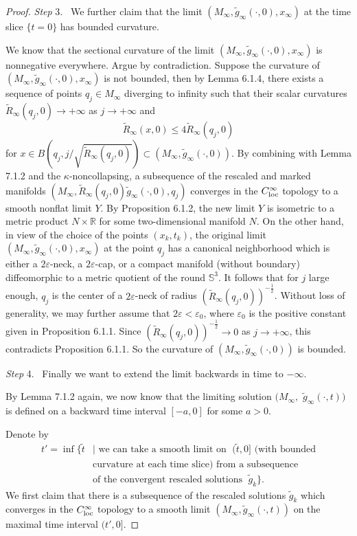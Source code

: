 \begin{proof}
\medskip
{\it Step} 3. \ We further claim that the limit $(M_{\infty},
\tilde{g}_{\infty}(\cdot,0),x_{\infty})$ at the time slice $\{ t=0
\}$ has bounded curvature.

We know that the sectional curvature of the limit $(M_{\infty},
\tilde{g}_{\infty}(\cdot,0),x_{\infty})$ is nonnegative
everywhere. Argue by contradiction. Suppose the curvature of
$(M_{\infty}, \tilde{g}_{\infty}(\cdot,0),x_{\infty})$ is not
bounded, then by Lemma 6.1.4, there exists a sequence of points
$q_j \in M_{\infty}$ diverging to infinity such that their scalar
curvatures $\tilde{R}_{\infty}(q_j,0) \rightarrow +\infty$ as $j
\rightarrow +\infty$ and
$$
\tilde{R}_{\infty}(x,0) \leq 4\tilde{R}_{\infty}(q_j,0)
$$
for $x \in B(q_j, j/\sqrt{\tilde{R}_{\infty}(q_j,0)})\subset
(M_{\infty},\tilde{g}_{\infty}(\cdot,0))$. By combining with Lemma
7.1.2 and the $\kappa$-noncollapsing, a subsequence of the
rescaled and marked manifolds
$(M_{\infty},\tilde{R}_{\infty}(q_j,0)\tilde{g}_{\infty}(\cdot,0),q_j)$
converges in the $C^{\infty}_{\rm loc}$ topology to a smooth
nonflat limit $Y$. By Proposition 6.1.2, the new limit $Y$ is
isometric to a metric product $N \times \mathbb{R}$ for some
two-dimensional manifold $N$. On the other hand, in view of the
choice of the points $(x_k,t_k)$, the original limit $(M_{\infty},
\tilde{g}_{\infty}(\cdot,0),x_{\infty})$ at the point $q_j$ has a
canonical neighborhood which is either a $2\varepsilon$-neck, a
$2\varepsilon$-cap, or a compact manifold (without boundary)
diffeomorphic to a metric quotient of the round $\mathbb{S}^3$. It
follows that for $j$ large enough, $q_j$ is the center of a
$2\varepsilon$-neck of radius
$(\tilde{R}_{\infty}(q_j,0))^{-\frac{1}{2}}$. Without loss of
generality, we may further assume that $2\varepsilon <
\varepsilon_0$, where $\varepsilon_0$ is the positive constant
given in Proposition 6.1.1. Since
$(\tilde{R}_{\infty}(q_j,0))^{-\frac{1}{2}}\rightarrow 0$ as
$j\rightarrow +\infty$, this contradicts Proposition 6.1.1. So the
curvature of $(M_{\infty}, \tilde{g}_{\infty}(\cdot,0))$ is
bounded.

\medskip
{\it Step} 4. \  Finally we want to extend the limit backwards in
time to $-\infty$.

By Lemma 7.1.2 again, we now know that the limiting solution
$(M_{\infty},$ $\tilde{g}_{\infty}(\cdot,t))$ is defined on a
backward time interval $[-a,0]$ for some $a>0$.

Denote by
\begin{align*}
t' = \inf \{ \tilde{t}&  | \mbox{ we can take a
smooth limit on }\; (\tilde{t},0]  \mbox { (with bounded} \\
& \mbox {curvature at each time slice) from a subsequence}\\
&  \mbox {of the convergent rescaled solutions }\; \tilde{g}_k\}.
\end{align*}
We first claim that there is a subsequence of the rescaled
solutions $\tilde{g}_k$ which converges in the $C^{\infty}_{\rm
loc}$ topology to a smooth limit
$(M_{\infty},\tilde{g}_{\infty}(\cdot,t))$ on the maximal time
interval $(t',0]$.


\end{proof}
